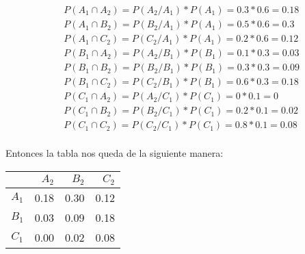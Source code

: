 \documentclass[11pt]{article}
\begin{document}
\begin{align*}
    &P(A_1 \cap A_2) = P(A_2/A_1) * P(A_1) = 0.3 * 0.6 = 0.18 \\
    &P(A_1 \cap B_2) = P(B_2/A_1) * P(A_1) = 0.5 * 0.6 = 0.3 \\
    &P(A_1 \cap C_2) = P(C_2/A_1) * P(A_1) = 0.2 * 0.6 = 0.12 \\
    &P(B_1 \cap A_2) = P(A_2/B_1) * P(B_1) = 0.1 * 0.3 = 0.03 \\
    &P(B_1 \cap B_2) = P(B_2/B_1) * P(B_1) = 0.3 * 0.3 = 0.09 \\
    &P(B_1 \cap C_2) = P(C_2/B_1) * P(B_1) = 0.6 * 0.3 = 0.18 \\
    &P(C_1 \cap A_2) = P(A_2/C_1) * P(C_1) = 0 * 0.1 = 0 \\
    &P(C_1 \cap B_2) = P(B_2/C_1) * P(C_1) = 0.2 * 0.1 = 0.02 \\
    &P(C_1 \cap C_2) = P(C_2/C_1) * P(C_1) = 0.8 * 0.1 = 0.08 \\
\end{align*}

\begin{justify}
  Entonces la tabla nos queda de la siguiente manera:
\end{justify}

\begin{center}
  \begin{tabular}{| c | r | r | r |}
    \hline
    & $A_2$ & $B_2$ & $C_2$ \\ \hline
    $A_1$ & 0.18 & 0.30 & 0.12 \\ \hline
    $B_1$ & 0.03 & 0.09 & 0.18 \\ \hline
    $C_1$ & 0.00 & 0.02 & 0.08 \\ \hline
  \end{tabular}
\end{center}

\end{document}
